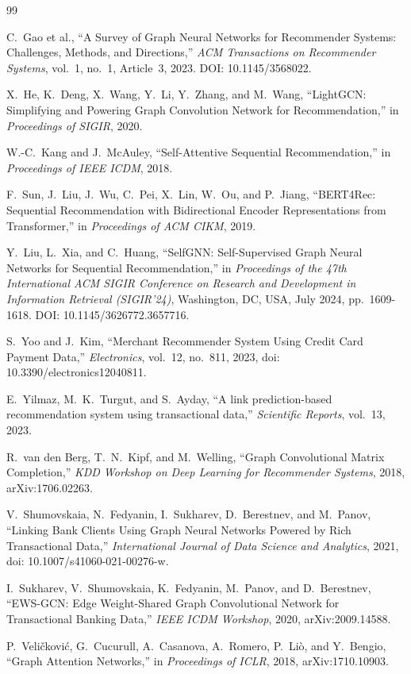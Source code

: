 \documentclass[conference]{IEEEtran}
\begin{document}
\renewcommand\refname{Зүүлт}
\begin{thebibliography}{99}

 C.~Gao et al., ``A Survey of Graph Neural Networks for Recommender Systems: Challenges, Methods, and Directions,'' \textit{ACM Transactions on Recommender Systems}, vol.~1, no.~1, Article~3, 2023. DOI: 10.1145/3568022.

 X.~He, K.~Deng, X.~Wang, Y.~Li, Y.~Zhang, and M.~Wang, ``LightGCN: Simplifying and Powering Graph Convolution Network for Recommendation,'' in \textit{Proceedings of SIGIR}, 2020.

 W.-C.~Kang and J.~McAuley, ``Self-Attentive Sequential Recommendation,'' in \textit{Proceedings of IEEE ICDM}, 2018.

 F.~Sun, J.~Liu, J.~Wu, C.~Pei, X.~Lin, W.~Ou, and P.~Jiang, ``BERT4Rec: Sequential Recommendation with Bidirectional Encoder Representations from Transformer,'' in \textit{Proceedings of ACM CIKM}, 2019.

 Y.~Liu, L.~Xia, and C.~Huang, ``SelfGNN: Self-Supervised Graph Neural Networks for Sequential Recommendation,'' in \textit{Proceedings of the 47th International ACM SIGIR Conference on Research and Development in Information Retrieval (SIGIR'24)}, Washington, DC, USA, July 2024, pp.~1609-1618. DOI: 10.1145/3626772.3657716.

 S.~Yoo and J.~Kim, ``Merchant Recommender System Using Credit Card Payment Data,'' \textit{Electronics}, vol.~12, no.~811, 2023, doi: 10.3390/electronics12040811.

E.~Yilmaz, M.~K.~Turgut, and S.~Ayday, ``A link prediction-based recommendation system using transactional data,'' \textit{Scientific Reports}, vol.~13, 2023.

 R.~van den Berg, T.~N.~Kipf, and M.~Welling, ``Graph Convolutional Matrix Completion,'' \textit{KDD Workshop on Deep Learning for Recommender Systems}, 2018, arXiv:1706.02263.

 V.~Shumovskaia, N.~Fedyanin, I.~Sukharev, D.~Berestnev, and M.~Panov, ``Linking Bank Clients Using Graph Neural Networks Powered by Rich Transactional Data,'' \textit{International Journal of Data Science and Analytics}, 2021, doi: 10.1007/s41060-021-00276-w.

 I.~Sukharev, V.~Shumovskaia, K.~Fedyanin, M.~Panov, and D.~Berestnev, ``EWS-GCN: Edge Weight-Shared Graph Convolutional Network for Transactional Banking Data,'' \textit{IEEE ICDM Workshop}, 2020, arXiv:2009.14588.

 P.~Veli\v{c}kovi\'{c}, G.~Cucurull, A.~Casanova, A.~Romero, P.~Li\`{o}, and Y.~Bengio, ``Graph Attention Networks,'' in \textit{Proceedings of ICLR}, 2018, arXiv:1710.10903.

\end{thebibliography}
\end{document}
